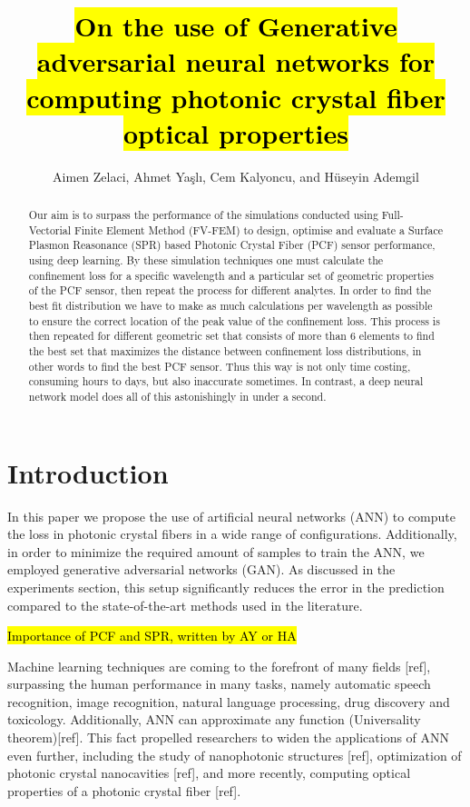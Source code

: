 \documentclass[draft, a4, 10pt, onecolumn]{IEEEtran}
\begin{document}
\title{\hl{On the use of Generative adversarial neural networks for computing photonic crystal fiber optical properties}}

\author{Aimen Zelaci, Ahmet Yaşlı, Cem Kalyoncu, and Hüseyin Ademgil}

\maketitle
	
\begin{abstract}
Our aim is to surpass the performance of the simulations conducted using Full-Vectorial Finite Element Method (FV-FEM) to design, optimise and evaluate a Surface Plasmon Reasonance (SPR) based Photonic Crystal Fiber (PCF) sensor performance, using deep learning. By these simulation techniques one must calculate the confinement loss for a specific wavelength and a particular set of geometric properties of the PCF sensor, then repeat the process for different analytes. In order to find the best fit distribution we have to make as much calculations per wavelength as possible to ensure the correct location of the peak value of the confinement loss. This process is then repeated for different geometric set that consists of more than 6 elements to find the best set that maximizes the distance between confinement loss distributions, in other words to find the best PCF sensor. Thus this way is not only time costing, consuming hours to days, but also inaccurate sometimes. In contrast, a deep neural network model does all of this astonishingly in under a second.

\end{abstract}

\section{Introduction}

In this paper we propose the use of artificial neural networks (ANN) to compute the loss in photonic crystal fibers in a wide range of configurations. Additionally, in order to minimize the required amount of samples to train the ANN, we employed generative adversarial networks (GAN). As discussed in the experiments section, this setup significantly reduces the error in the prediction compared to the state-of-the-art methods used in the literature.

\hl{Importance of PCF and SPR, written by AY or HA}

Machine learning techniques are coming to the forefront of many fields [ref], surpassing the human performance in many tasks, namely automatic speech recognition, image recognition, natural language processing, drug discovery and toxicology. Additionally, ANN can approximate any function (Universality theorem)[ref]. This fact propelled researchers to widen the applications of ANN even further, including the study of nanophotonic structures [ref], optimization of photonic crystal nanocavities [ref], and more recently, computing optical properties of a photonic crystal fiber [ref].
\end{document}
